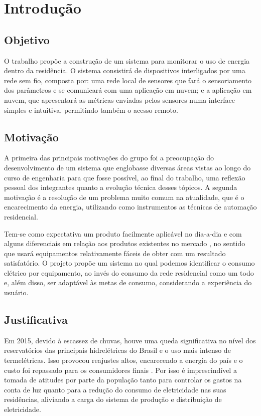 \chapter{Introdução}
\label{Cap:Introducao}

\section{Objetivo}
\label{Sec:objetivo}

O trabalho propõe a construção de um sistema para monitorar o uso de energia dentro da residência. O sistema consistirá  de dispositivos interligados por uma rede sem fio, composta por: uma rede local de sensores  que fará o sensoriamento dos parâmetros e se comunicará com uma aplicação em nuvem; e a aplicação em nuvem, que apresentará as métricas enviadas pelos sensores numa interface simples e intuitiva, permitindo também o acesso remoto.

\section{Motivação}
\label{Sec:motivacao}

A primeira das principais motivações do grupo foi a preocupação do desenvolvimento de um sistema que englobasse diversas áreas vistas ao longo do curso de engenharia para que fosse possível, ao final do trabalho, uma reflexão pessoal dos integrantes quanto a evolução técnica desses tópicos. A segunda motivação é a resolução de um problema muito comum na atualidade, que é o encarecimento da energia,  utilizando como instrumentos as técnicas de automação residencial.

Tem-se como expectativa um produto facilmente aplicável no dia-a-dia e com alguns diferenciais em relação aos produtos existentes no mercado \cite{green_ant_site}, no sentido que usará equipamentos relativamente fáceis de obter com um resultado satisfatório. O projeto propõe um sistema no qual podemos identificar o consumo elétrico por equipamento, ao invés do consumo da rede residencial como um todo e, além disso, ser adaptável às metas de consumo, considerando a experiência do usuário.

\section{Justificativa}
\label{Sec:justificativa}

Em 2015, devido à escassez de chuvas, houve uma queda significativa no nível dos reservatórios das principais hidrelétricas do Brasil e o uso mais intenso de termelétricas. Isso provocou reajustes altos, encarecendo a energia do país e o custo foi repassado para os consumidores finais \cite{news_g1}  \cite{news_secretaria_de_energia}. Por isso é imprescindível a tomada de atitudes por parte da população tanto para controlar os gastos na conta de luz quanto para a redução do consumo de eletricidade nas suas residências,  aliviando a carga do sistema de produção e distribuição de eletricidade.

